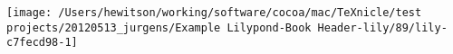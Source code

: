 \texttt{[image: /Users/hewitson/working/software/cocoa/mac/TeXnicle/test projects/20120513\_jurgens/Example Lilypond-Book Header-lily/89/lily-c7fecd98-1]}%
